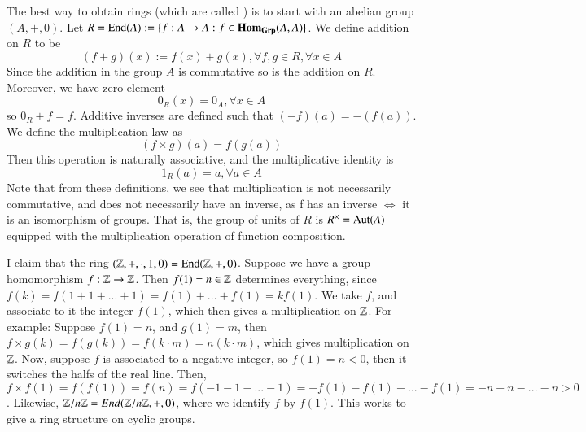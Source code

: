 \begin{construction}
    The best way to obtain rings (which are called ) is to start with an abelian group $(A,+,0)$. Let $R = \operatorname{End}(A) := \{f:A\rightarrow A: f \in \mathbf{Hom}_{\normalfont\textbf{Grp}}(A,A)\}$. We define addition on $R$ to be \begin{equation}
        (f+g)(x) := f(x)+g(x), \forall f,g \in R, \forall x \in A
    \end{equation}
    Since the addition in the group $A$ is commutative so is the addition on $R$. Moreover, we have zero element \begin{equation}
        0_R(x) = 0_A,\forall x \in A
    \end{equation}
    so $0_R  + f = f$. Additive inverses are defined such that $(-f)(a) = -(f(a))$. We define the multiplication law as \begin{equation}
        (f\times g)(a) = f(g(a))
    \end{equation}
    Then this operation is naturally associative, and the multiplicative identity is \begin{equation}
        1_R(a) = a, \forall a \in A
    \end{equation}
    Note that from these definitions, we see that multiplication is not necessarily commutative, and does not necessarily have an inverse, as f has an inverse $\iff$ it is an isomorphism of groups. That is, the group of units of $R$ is $R^{\times} = \operatorname{Aut}(A)$ equipped with the multiplication operation of function composition.
\end{construction}

\begin{example}
        I claim that the ring $(\mathbb Z,+,\cdot,1,0) = \operatorname{End}(\mathbb Z,+,0)$. Suppose we have a group homomorphism $f:\mathbb Z\rightarrow \mathbb Z$. Then $f(1) = n \in \mathbb Z$ determines everything, since $f(k) = f(1+1+...+1) = f(1)+...+f(1) = kf(1)$. We take $f$, and associate to it the integer $f(1)$, which then gives a multiplication on $\mathbb Z$. For example: Suppose $f(1) = n$, and $g(1) = m$, then $f\times g(k) = f(g(k)) = f(k\cdot m) = n(k\cdot m)$, which gives multiplication on $\mathbb Z$. Now, suppose $f$ is associated to a negative integer, so $f(1) = n < 0$, then it switches the halfs of the real line. Then, $f\times f(1) = f(f(1)) = f(n) = f(-1-1-...-1) = -f(1)-f(1)-...-f(1) = -n-n-...-n > 0$. Likewise, $\mathbb Z/n\mathbb Z = End(\mathbb Z/n\mathbb Z,+,0)$, where we identify $f$ by $f(1)$. This works to give a ring structure on cyclic groups.
\end{example}

